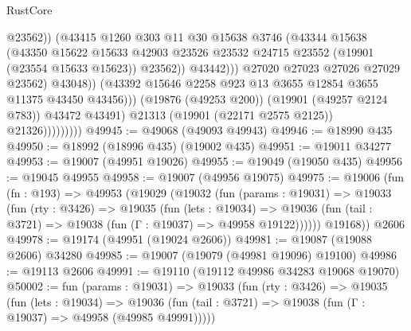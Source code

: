 \begin{lexlean}{RustCore}
\begin{coremodule}
                                          @23562))
                                      (@43415
                                        @1260
                                        @303
                                        @11
                                        @30
                                        @15638
                                        @3746
                                        (@43344
                                          @15638
                                          (@43350
                                            @15622
                                            @15633
                                            @42903
                                            @23526
                                            @23532
                                            @24715
                                            @23552
                                            (@19901 (@23554 @15633 @15623))
                                            @23562))
                                        @43442)))
                                  @27020
                                  @27023
                                  @27026
                                  @27029
                                  @23562)
                                @43048))
                            (@43392 @15646 @2258 @923 @13 @3655 @12854 @3655 @11375 @43450 @43456)))
                        (@19876 (@49253 @200))
                        (@19901 (@49257 @2124 @783))
                        @43472
                        @43491)
                      @21313
                      (@19901 (@22171 @2575 @2125))
                      @21326)))))))))
@49945 := @49068 (@49093 @49943)
@49946 := @18990 @435
@49950 := @18992 (@18996 @435) (@19002 @435)
@49951 := @19011 @34277
@49953 := @19007 (@49951 @19026)
@49955 := @19049 (@19050 @435)
@49956 := @19045 @49955
@49958 := @19007 (@49956 @19075)
@49975 := @19006
    (fun (fn : @193) =>
    @49953
      (@19029
        (@19032
          (fun (params : @19031) =>
          @19033
            (fun (rty : @3426) =>
            @19035
              (fun (lets : @19034) =>
              @19036 (fun (tail : @3721) => @19038 (fun (Γ : @19037) => @49958 @19122))))))
        @19168))
    @2606
@49978 := @19174 (@49951 (@19024 @2606))
@49981 := @19087 (@19088 @2606) @34280
@49985 := @19007 (@19079 (@49981 @19096) @19100)
@49986 := @19113 @2606
@49991 := @19110 (@19112 @49986 @34283 @19068 @19070)
@50002 := fun (params : @19031) =>
  @19033
    (fun (rty : @3426) =>
    @19035
      (fun (lets : @19034) =>
      @19036 (fun (tail : @3721) => @19038 (fun (Γ : @19037) => @49958 (@49985 @49991)))))

\end{coremodule}
\end{lexlean}
